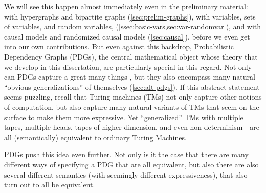 %
We will see this happen almost immediately even in the preliminary material: with hypergraphs and bipartite graphs (\cref{sec:prelim-graphs}), with variables, sets of variables, and random variables, (\cref{ssec:basic-vars,sec:var-randomvar}), and with causal models and randomized causal models (\cref{sec:causal}),
before we even get into our own contributions. 
%
But even against this backdrop,
Probabilistic Dependency Graphs (PDGs), the central mathematical object whose theory that we develop in this dissertation, are particularly special in this regard. 
Not only can PDGs capture a great many things 
\unskip, but they also encompass many natural ``obvious generalizations'' of themselves (\cref{sec:alt-pdgs}). 
If this abstract statement seems puzzling, recall that Turing machines (TMs) not only capture other notions of computation, but also capture many natural variants of TMs that seem on the surface to make them more expressive.  
Yet ``generalized'' TMs with multiple tapes, multiple heads, tapes of higher dimension, and even non-determinism---are all (semantically) equivalent to ordinary Turing Machines. 

PDGs push this idea even further.
Not only is it the case that there are many different ways of specifying a PDG that are all equivalent, 
but also there are also several different semantics (with seemingly different expressiveness), that also turn out to all be equivalent.     
%
